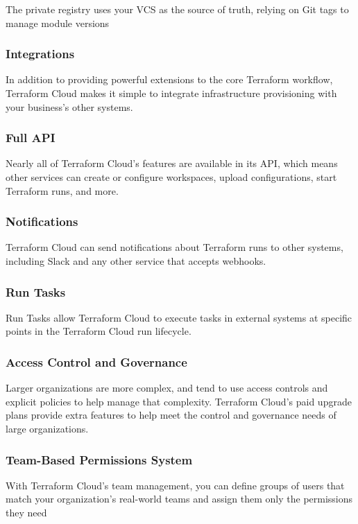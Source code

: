 \documentclass[12pt, letterpaper, twoside]{article}
\begin{document}
The private registry uses your VCS as the source of truth, relying on Git tags to manage module versions

\subsubsection{Integrations}
In addition to providing powerful extensions to the core Terraform workflow, Terraform Cloud makes it 
simple to integrate infrastructure provisioning with your business's other systems.

\subsubsection{Full API}
Nearly all of Terraform Cloud's features are available in its API, which means other services can create 
or configure workspaces, upload configurations, start Terraform runs, and more.

\subsubsection{Notifications}
Terraform Cloud can send notifications about Terraform runs to other systems, including Slack and any 
other service that accepts webhooks.

\subsubsection{Run Tasks}
Run Tasks allow Terraform Cloud to execute tasks in external systems at specific points in the Terraform 
Cloud run lifecycle.

\subsubsection{Access Control and Governance}
Larger organizations are more complex, and tend to use access controls and explicit policies to help manage 
that complexity. Terraform Cloud's paid upgrade plans provide extra features to help meet the control and 
governance needs of large organizations.

\subsubsection{Team-Based Permissions System}
With Terraform Cloud's team management, you can define groups of users that match your organization's 
real-world teams and assign them only the permissions they need
\end{document}

